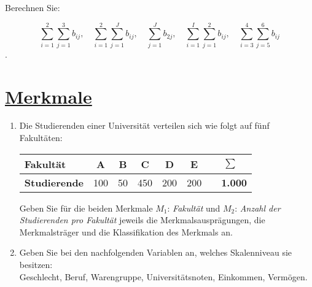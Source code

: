 \documentclass[12pt,a4paper]{article}
\newcommand{\tmpsection}[1]{}
\let\tmpsection=\section
\renewcommand{\section}[1]{\tmpsection{\underline{#1}} }
\begin{document}
Berechnen Sie:

\[\sum_{i=1}^2\sum_{j=1}^3 b_{ij}, \quad \sum_{i=1}^2\sum_{j=1}^J b_{ij}, \quad \sum_{j=1}^J b_{2j}, \quad \sum_{i=1}^I\sum_{j=1}^2 b_{ij}, \quad \sum_{i=3}^4\sum_{j=5}^6 b_{ij}\].

\vspace{.5cm}

\hypertarget{merkmale}{%
\section{Merkmale}\label{merkmale}}

\begin{enumerate}[label=(\alph*)]
  \item Die Studierenden einer Universität verteilen sich wie folgt auf fünf Fakultäten:
  
  \begin{center}
    \begin{tabular}{lcccccr}
      \textbf{Fakultät}    & A   & B  & C   & D   & E   & $\sum\quad$ \\
        \midrule
      \textbf{Studierende} & 100 & 50 & 450 & 200 & 200 & $\quad$\textbf{1.000} \\
    \end{tabular}
  \end{center}
  
  

Geben Sie für die beiden Merkmale $M_1$: \textit{Fakultät} und $M_2$: \textit{Anzahl der Studierenden pro Fakultät} jeweils die Merkmalsausprägungen, die Merkmalsträger und die Klassifikation des Merkmals an.\\
\item Geben Sie bei den nachfolgenden Variablen an, welches Skalenniveau sie besitzen:\\
Geschlecht, Beruf, Warengruppe, Universitätsnoten, Einkommen, Vermögen.
\end{enumerate}
\end{document}

